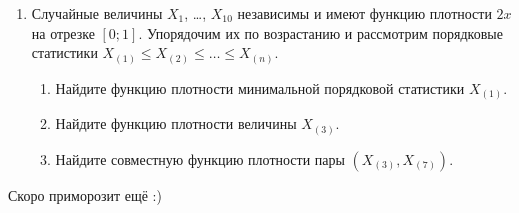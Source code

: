 \documentclass[12pt]{article}
\begin{document}
\begin{enumerate}
    \item Случайные величины $X_1$, \dots, $X_{10}$ независимы и имеют функцию плотности $2x$ на отрезке $[0;1]$.
    Упорядочим их по возрастанию и рассмотрим порядковые статистики $X_{(1)} \leq X_{(2)} \leq \dots \leq X_{(n)}$.
    \begin{enumerate}
        \item Найдите функцию плотности минимальной порядковой статистики $X_{(1)}$.
        \item Найдите функцию плотности величины $X_{(3)}$.
        \item Найдите совместную функцию плотности пары $(X_{(3)}, X_{(7)})$.
    \end{enumerate}
\end{enumerate}

Скоро приморозит ещё :)
\end{document}
